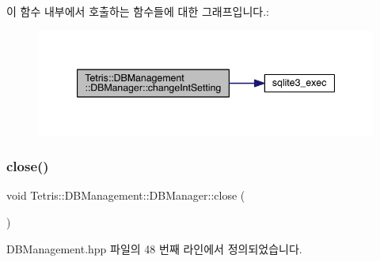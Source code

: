 이 함수 내부에서 호출하는 함수들에 대한 그래프입니다.\+:
\nopagebreak
\begin{figure}[H]
\begin{center}
\leavevmode
\includegraphics[width=344pt]{da/d79/class_tetris_1_1_d_b_management_1_1_d_b_manager_aead8bb3f2a64fdf6ac59c69bfd21a01e_cgraph}
\end{center}
\end{figure}
\mbox{\label{class_tetris_1_1_d_b_management_1_1_d_b_manager_a8390e6ddf3fa06e90fa5c2ab4997e5c1}} 
\subsubsection{\texorpdfstring{close()}{close()}}
{\footnotesize\ttfamily void Tetris\+::\+D\+B\+Management\+::\+D\+B\+Manager\+::close (\begin{DoxyParamCaption}{ }\end{DoxyParamCaption})\hspace{0.3cm}{\ttfamily [inline]}}



D\+B\+Management.\+hpp 파일의 48 번째 라인에서 정의되었습니다.


